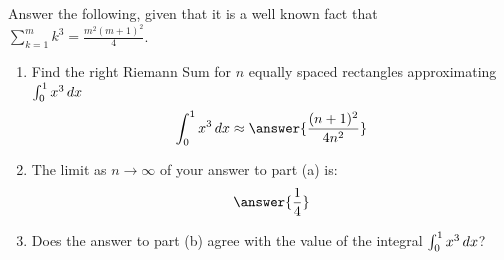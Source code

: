 \documentclass{ximera}
\author{Gregory Hartman \and Matthew Carr}
\begin{document}
\begin{exercise}



Answer the following, given that it is a well known fact that  $\sum_{k=1}^{m}k^3=\frac{m^2(m+1)^2}{4}$.

\begin{enumerate}
\item		Find the right Riemann Sum for $n$ equally spaced rectangles approximating $\int_{0}^{1}x^3\,d x$ \[\int_{0}^{1}x^3\d x\approx\answer{\frac{(n+1)^2}{4n^2}}\]
\item		The limit as $n\to\infty$ of your answer to part (a) is: \[\answer{\frac{1}{4}}\]
\item		Does the answer to part (b) agree with the value of the integral $\int_{0}^{1}x^3\,d x$? \begin{multipleChoice}
\end{multipleChoice}
\end{enumerate}
\end{exercise}
\end{document}
